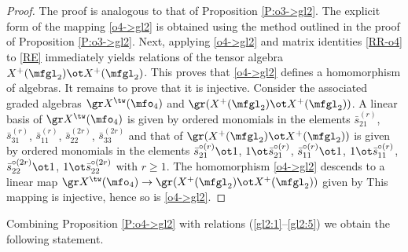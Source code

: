 \documentclass{amsart}
\numberwithin{equation}{section}
\theoremstyle{remark}
\renewcommand{\,}{\kern 0.1em} %
\begin{document}
\begin{proof}
%
The proof is analogous to that of Proposition \ref{P:o3->gl2}. The explicit form of the mapping \eqref{o4->gl2} is obtained using the method outlined in the proof of Proposition \ref{P:o3->gl2}. Next, applying \eqref{o4->gl2} and matrix identities \eqref{RR-o4} to \eqref{RE} immediately yields relations of the tensor algebra $X^+(\mfgl_2) \ot X^+(\mfgl_2)$. This proves that \eqref{o4->gl2} defines a homomorphism of algebras. It remains to prove that it is injective. 
Consider the associated graded algebras $\gr X^\tw(\mfo_4)$ and $\gr (X^+(\mfgl_2) \ot X^+(\mfgl_2))$.
A linear basis of $\gr X^\tw(\mfo_4)$ is given by ordered monomials in the elements $\bar{s}_{21}^{(r)}$, $\bar{s}_{31}^{(r)}$, $\bar{s}_{11}^{(r)}$, $\bar{s}_{22}^{(2r)}$, $\bar{s}_{33}^{(2r)}$ and that of $\gr(X^+(\mfgl_2) \ot X^+(\mfgl_2))$ is given by ordered monomials in the elements $\bar{s}_{21}^{\circ(r)}\ot 1$, $1\ot \bar{s}_{21}^{\circ(r)}$, $\bar{s}_{11}^{\circ(r)} \ot 1$, $1\ot \bar{s}_{11}^{\circ(r)}$, $\bar{s}^{\circ(2r)}_{22} \ot 1$, $1\ot \bar{s}^{\circ(2r)}_{22}$ with $r\ge 1$.  The homomorphism \eqref{o4->gl2} descends to a linear map $\gr X^\tw(\mfo_4) \to \gr(X^+(\mfgl_2) \ot X^+(\mfgl_2))$ given by 
%
%
This mapping is injective, hence so is \eqref{o4->gl2}.
%
\end{proof}



Combining Proposition \ref{P:o4->gl2} with relations (\ref{gl2:1}--\ref{gl2:5}) we obtain the following statement.
\end{document}
